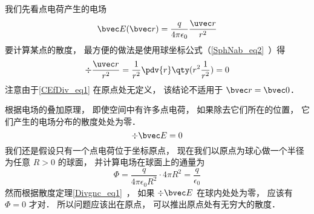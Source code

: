 

我们先看点电荷产生的电场
\begin{equation}\label{CEfDiv_eq1}
\bvec E(\bvec r) = \frac{q}{4\pi\epsilon_0}\frac{\uvec r}{r^2}
\end{equation}
要计算某点的散度， 最方便的做法是使用球坐标公式（\autoref{SphNab_eq2}~）得
\begin{equation}
\div \frac{\uvec r}{r^2} = \frac{1}{r^2} \pdv{r} \qty(r^2 \frac{1}{r^2}) = 0
\end{equation}
注意由于\autoref{CEfDiv_eq1} 在原点处无定义， 该结论不适用于 $\bvec r = \bvec 0$．

根据电场的叠加原理， 即使空间中有许多点电荷， 如果除去它们所在的位置， 它们产生的电场分布的散度处处为零．
\begin{equation}
\div \bvec E = 0
\end{equation}
我们还是假设只有一个点电荷位于坐标原点， 现在我们以原点为球心做一个半径为任意 $R > 0$ 的球面， 并计算电场在球面上的通量为
\begin{equation}
\Phi = \frac{q}{4\pi\epsilon_0 R^2} \cdot 4\pi R^2 = \frac{q}{\epsilon_0}
\end{equation}
然而根据散度定理\autoref{Divgnc_eq1}~， 如果 $\div \bvec E$ 在球内处处为零， 应该有 $\Phi = 0$ 才对． 所以问题应该出在原点， 可以推出原点处有无穷大的散度．
